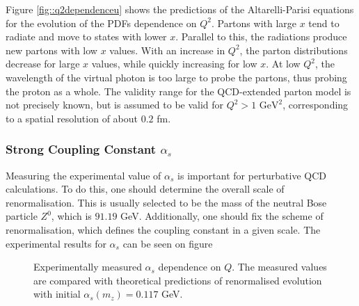     Figure \ref{fig::q2dependenceu} shows the predictions of the Altarelli-Parisi equations for the evolution of the PDFs dependence on $Q^2$.
    Partons with large $x$ tend to radiate and move to states with lower $x$.
    Parallel to this, the radiations produce new partons with low $x$ values.
    With an increase in $Q^2$, the parton distributions decrease for large $x$ values, while quickly increasing for low $x$.
    At low $Q^2$, the wavelength of the virtual photon is too large to probe the partons, thus probing the proton as a whole.
    The validity range for the QCD-extended parton model is not precisely known, but is assumed to be valid for $Q^2 > 1 \text{ GeV}^2$, corresponding to a spatial resolution of about $0.2$ fm.

    \subsubsection{Strong Coupling Constant $\alpha_s$}
        Measuring the experimental value of $\alpha_s$ is important for perturbative QCD calculations.
        To do this, one should determine the overall scale of renormalisation.
        This is usually selected to be the mass of the neutral Bose particle $Z^0$, which is $91.19$ GeV.
        Additionally, one should fix the scheme of renormalisation, which defines the coupling constant in a given scale.
        The experimental results for $\alpha_s$ can be seen on figure

        \begin{figure}[b!] %
            \centering{}
            \caption[$\alpha_s$ dependence on $Q^2$.]{Experimentally measured $\alpha_s$ dependence on $Q$.
            The measured values are compared with theoretical predictions of renormalised evolution with initial $\alpha_s(m_z) = 0.117$ GeV.}
            \label{fig::alpha_q_dependence}
        \end{figure}
